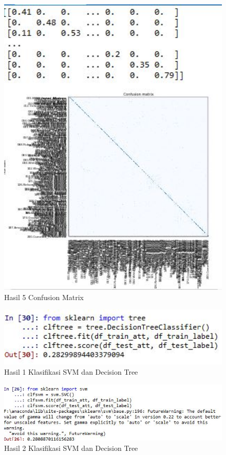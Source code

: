 \begin{figure}[ht]
	\centerline{\includegraphics[width=1\textwidth]{figures/huda/chapter3_praktek/26.JPG}}
	\caption{Hasil 5 Confusion Matrix}
	\label{h30}
\end{figure}

\begin{figure}[ht]
	\centerline{\includegraphics[width=1\textwidth]{figures/huda/chapter3_praktek/27.JPG}}
	\caption{Hasil 1 Klasifikasi SVM dan Decision Tree}
	\label{h31}
\end{figure}

\begin{figure}[ht]
	\centerline{\includegraphics[width=1\textwidth]{figures/huda/chapter3_praktek/28.JPG}}
	\caption{Hasil 2 Klasifikasi SVM dan Decision Tree}
	\label{h32}
\end{figure}

